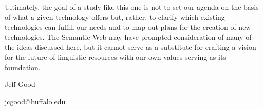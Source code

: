 \documentclass[12pt]{article}
\begin{document}
Ultimately, the goal of a study like this one is not to set our agenda on the
basis of what a given technology offers but, rather, to clarify which existing
technologies can fulfill our needs and to map out plans for the creation of new
technologies. The Semantic Web may have prompted consideration of many of the
ideas discussed here, but it cannot serve as a substitute for crafting a vision
for the future of linguistic resources with our own values serving as its
foundation.



\pagebreak


{}

\bigskip
\bigskip
\bigskip

{\small

\hfill Jeff Good

\hfill jcgood@buffalo.edu

}
\end{document}
